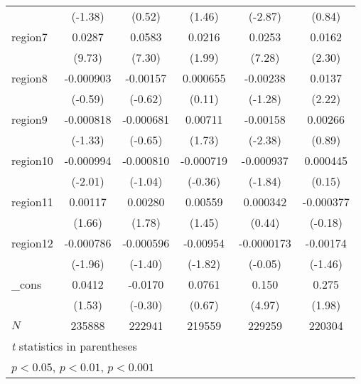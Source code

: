 \begin{table}[htbp]
\begin{tabular}{l*{5}{c}}
            &     (-1.38)         &      (0.52)         &      (1.46)         &     (-2.87)         &      (0.84)         \\
region7     &      0.0287\sym{***}&      0.0583\sym{***}&      0.0216\sym{*}  &      0.0253\sym{***}&      0.0162\sym{*}  \\
            &      (9.73)         &      (7.30)         &      (1.99)         &      (7.28)         &      (2.30)         \\
region8     &   -0.000903         &    -0.00157         &    0.000655         &    -0.00238         &      0.0137\sym{*}  \\
            &     (-0.59)         &     (-0.62)         &      (0.11)         &     (-1.28)         &      (2.22)         \\
region9     &   -0.000818         &   -0.000681         &     0.00711         &    -0.00158\sym{*}  &     0.00266         \\
            &     (-1.33)         &     (-0.65)         &      (1.73)         &     (-2.38)         &      (0.89)         \\
region10    &   -0.000994\sym{*}  &   -0.000810         &   -0.000719         &   -0.000937         &    0.000445         \\
            &     (-2.01)         &     (-1.04)         &     (-0.36)         &     (-1.84)         &      (0.15)         \\
region11    &     0.00117         &     0.00280         &     0.00559         &    0.000342         &   -0.000377         \\
            &      (1.66)         &      (1.78)         &      (1.45)         &      (0.44)         &     (-0.18)         \\
region12    &   -0.000786\sym{*}  &   -0.000596         &    -0.00954         &  -0.0000173         &    -0.00174         \\
            &     (-1.96)         &     (-1.40)         &     (-1.82)         &     (-0.05)         &     (-1.46)         \\
\_cons      &      0.0412         &     -0.0170         &      0.0761         &       0.150\sym{***}&       0.275\sym{*}  \\
            &      (1.53)         &     (-0.30)         &      (0.67)         &      (4.97)         &      (1.98)         \\
\hline
\(N\)       &      235888         &      222941         &      219559         &      229259         &      220304         \\
\hline\hline
\multicolumn{6}{l}{\footnotesize \textit{t} statistics in parentheses}\\
\multicolumn{6}{l}{\footnotesize \sym{*} \(p<0.05\), \sym{**} \(p<0.01\), \sym{***} \(p<0.001\)}\\
\end{tabular}
\label{tab:oaxaca_male_nonclustered}
\end{table}
